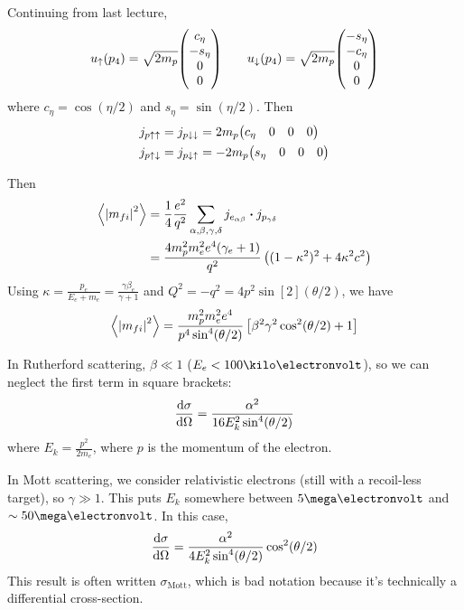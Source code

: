 \documentclass[a4paper,twoside,master.tex]{subfiles}
\begin{document}

Continuing from last lecture,
\begin{equation}
    u_{\uparrow}(p_4) = \sqrt{2 m_p} \mqty(c_{\eta} \\ -s_{\eta} \\ 0 \\ 0) \qquad u_{\downarrow}(p_4) = \sqrt{2 m_p} \mqty(-s_{\eta} \\ -c_{\eta} \\ 0 \\ 0)
\end{equation}
where $ c_{\eta} = \cos(\eta / 2) $ and $ s_{\eta} = \sin(\eta / 2) $. Then
\begin{align}
    j_{p \uparrow\uparrow} &= j_{p\downarrow\downarrow} = 2m_p \mqty(c_{\eta} & 0 & 0 & 0) \\
    j_{p \uparrow\downarrow} &= j_{p\downarrow\uparrow} = -2m_p \mqty(s_{\eta} & 0 & 0 & 0)
\end{align}

Then
\begin{align}
    \ev{\abs{m_{fi}}^2} &= \frac{1}{4} \frac{e^2}{q^2} \sum_{\alpha, \beta, \gamma, \delta} j_{e_{\alpha \beta}} \vdot j_{p_{\gamma \delta}} \\
                        &= \frac{4 m_p^2 m_e^2 e^4 (\gamma_e + 1)}{q^2} \left( (1 - \kappa^2)^2 + 4 \kappa^2 c^2 \right)
\end{align}
Using $ \kappa = \frac{p_e}{E_e + m_e} = \frac{\gamma \beta_e}{\gamma + 1} $ and $ Q^2 = - q^2 = 4 p^2 \sin[2](\theta / 2) $, we have
\begin{equation}
    \ev{\abs{m_{fi}}^2} = \frac{m_p^2 m_e^2 e^4}{p^4 \sin[4](\theta / 2)} \left[ \beta^2 \gamma^2 \cos[2](\theta / 2) + 1 \right]
\end{equation}

In Rutherford scattering, $ \beta \ll 1 $ ($ E_e < 100\kilo\electronvolt $), so we can neglect the first term in square brackets:
\begin{equation}
    \dv{\sigma}{\Omega} = \frac{\alpha^2}{16 E_k^2 \sin[4](\theta / 2)}
\end{equation}
where $ E_k = \frac{p^2}{2m_e} $, where $ p $ is the momentum of the electron.

In Mott scattering, we consider relativistic electrons (still with a recoil-less target), so $ \gamma \gg 1 $. This puts $ E_k $ somewhere between $ 5\mega\electronvolt $ and $ \sim 50\mega\electronvolt $. In this case,
\begin{equation}
    \dv{\sigma}{\Omega} = \frac{\alpha^2}{4 E_k^2 \sin[4](\theta / 2)} \cos[2](\theta / 2)
\end{equation}
This result is often written $ \sigma_{\text{Mott}} $, which is bad notation because it's technically a differential cross-section.
\end{document}
